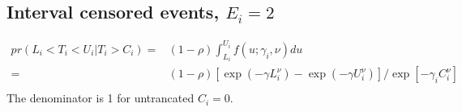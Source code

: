 \documentclass{article}
\begin{document}
\subsection{Interval censored events, $E_i =2$}


\begin{align*}
pr(L_i < T_i < U_i | T_i > C_i ) =& (1-\rho) \int_{L_i}^{U_i}f(u;\gamma_i, \nu) du 
\\
=& (1-\rho) \left[ \exp(-\gamma L_i^\nu) -  \exp(-\gamma U_i^\nu)\right] / \exp\left[-\gamma_i C_i^\nu\right]
\\
\end{align*}
The denominator is 1 for untrancated $C_i =0$.
\end{document}
